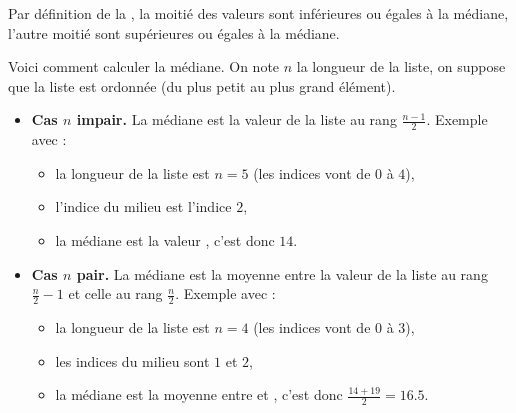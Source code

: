 \documentclass[11pt,class=report,crop=false]{standalone}
\begin{document}
\begin{cours}[Médiane]
Par définition de la , la moitié des valeurs sont inférieures ou égales à la médiane, l'autre moitié sont supérieures ou égales à la médiane.

Voici comment calculer la médiane. On note $n$ la longueur de la liste, on suppose que la liste est ordonnée (du plus petit au plus grand élément).
  \begin{itemize}
    \item \textbf{Cas $n$ impair.} La médiane est la valeur de la liste au rang $\frac{n-1}{2}$.    
    Exemple avec  :
    \begin{itemize}
      \item la longueur de la liste est $n=5$ (les indices vont de $0$ à $4$),
      \item l'indice du milieu est l'indice $2$,
      \item la médiane est la valeur , c'est donc $14$.
    \end{itemize}
    
    \item \textbf{Cas $n$ pair.} La médiane est la moyenne entre la valeur de la liste au rang $\frac{n}{2}-1$ et celle au rang $\frac{n}{2}$.
    Exemple avec  :
    \begin{itemize}
      \item la longueur de la liste est $n=4$ (les indices vont de $0$ à $3$),
      \item les indices du milieu sont $1$ et $2$,
      \item la médiane est la moyenne entre  et , c'est donc $\frac{14+19}{2} = 16.5$.
    \end{itemize}    
   \end{itemize} 
   

\end{cours}
\end{document}
